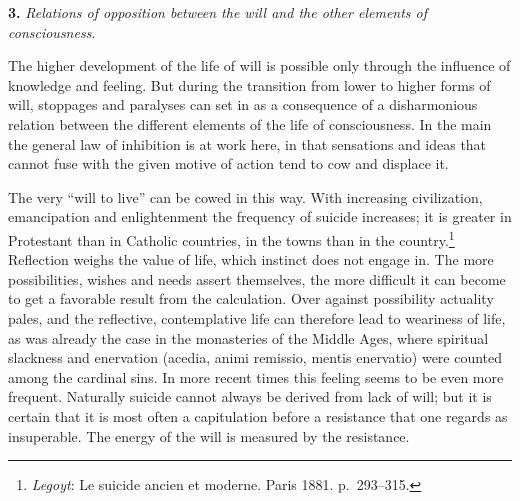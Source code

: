 \documentclass[12pt,a4paper]{book}
\newcommand{\opage}[1]{\marginnote{\footnotesize\textit{[#1]}}}
\begin{document}
\textbf{3.} \emph{Relations of opposition between the will and the other
elements of consciousness}.

The higher development of the life of will is possible only through the
influence of knowledge and feeling. But during the transition from lower
to higher forms of will, stoppages and paralyses can set in as a
consequence of a disharmonious relation between the different elements of
the life of consciousness. In the main the general law of inhibition is
at work here, in that sensations and ideas that cannot fuse with the given
motive of action tend to cow and displace it.

The very ``will to live'' can be cowed in this way. With increasing
civilization, emancipation and enlightenment the frequency of suicide
increases; it is greater in Protestant than in Catholic countries, in the
towns than in the
country.\footnote{\emph{Legoyt}: Le suicide ancien et moderne. Paris
1881. p.~293--315.} Reflection weighs the value of life, which instinct
does not engage in. The more possibilities, wishes and needs assert
themselves, the more difficult it can become to get a favorable result
from the calculation. Over against possibility actuality pales, and the
reflective, contemplative life can therefore lead to weariness of life,
\opage{392}as was already the case in the monasteries of the Middle Ages,
where spiritual slackness and enervation (acedia, animi remissio, mentis
enervatio) were counted among the cardinal sins. In more recent times this
feeling seems to be even more frequent. Naturally suicide cannot always be
derived from lack of will; but it is certain that it is most often a
capitulation before a resistance that one regards as insuperable. The
energy of the will is measured by the resistance.
\end{document}
